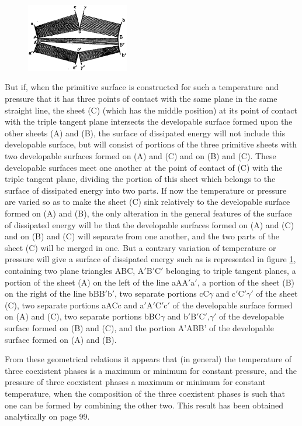 \documentclass[12pt]{memoir}
\begin{document}
\begin{figure} %
    \centering
    \includegraphics[width=0.4\textwidth]{fig_9}
    \caption{ }
    \label{fig_9}
\end{figure}
But if, when the primitive surface is constructed for such a temperature and pressure that it has three points of contact with the same plane in the same straight line, the sheet (C) (which has the middle position) at its point of contact with the triple tangent plane intersects the developable surface formed upon the other sheets (A) and (B), the surface of dissipated energy will not include this developable surface, but will consist of portions of the three primitive sheets with two developable surfaces formed on (A) and (C) and on (B) and (C). These developable surfaces meet one another at the point of contact of (C) with the triple tangent plane, dividing the portion of this sheet which belongs to the surface of dissipated energy into two parts. If now the temperature or pressure are varied so as to make the sheet (C) sink relatively to the developable surface formed on (A) and (B), the only alteration in the general features of the surface of dissipated energy will be that the developable surfaces formed on (A) and (C) and on (B) and (C) will separate from one another, and the two parts of the sheet (C) will be merged in one. But a contrary variation of temperature or pressure will give a surface of dissipated energy such as is represented in figure \ref{fig_9}, containing two plane triangles ABC, A$'$B$'$C$'$ belonging to triple tangent planes, a portion of the sheet (A) on the left of the line aAA$'$a$'$, a portion of the sheet (B) on the right of the line bBB$'$b$'$, two separate portions cC$\gamma$ and c$'$C$'$$\gamma'$ of the sheet (C), two separate portions aACc and a$'$A$'$C$'$c$'$ of the developable surface formed on (A) and (C), two separate portions bBC$\gamma$ and b$'$B$'$C$'$,$\gamma'$ of the developable surface formed on (B) and (C), and the portion A'ABB' of the developable surface formed on (A) and (B).


From these geometrical relations it appears that (in general) the temperature of three coexistent phases is a maximum or minimum for constant pressure, and the pressure of three coexistent phases a maximum or minimum for constant temperature, when the composition of the three coexistent phases is such that one can be formed by combining the other two. This result has been obtained analytically on page 99.
\end{document}

